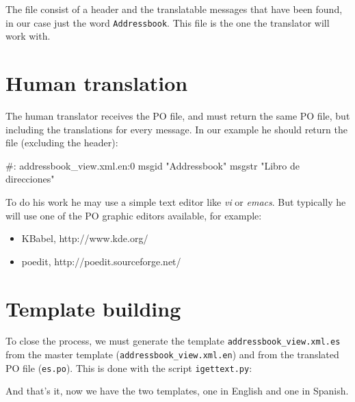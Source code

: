 The file consist of a header and the translatable messages that have been
found, in our case just the word {\tt Addressbook}. This file is the one
the translator will work with.


\section{Human translation}

The human translator receives the PO file, and must return the same PO
file, but including the translations for every message. In our example
he should return the file (excluding the header):

\begin{code}
    #: addressbook_view.xml.en:0
    msgid "Addressbook"
    msgstr "Libro de direcciones"
\end{code}

To do his work he may use a simple text editor like {\em vi} or {\em emacs}.
But typically he will use one of the PO graphic editors available, for
example:

\begin{itemize}
  \item KBabel, http://www.kde.org/
  \item poedit, http://poedit.sourceforge.net/
\end{itemize}


\section{Template building}

To close the process, we must generate the template
{\tt addressbook\_view.xml.es} from the master template
({\tt addressbook\_view.xml.en}) and from the translated PO file ({\tt es.po}).
This is done with the script {\tt igettext.py}:


And that's it, now we have the two templates, one in English and one in
Spanish.


